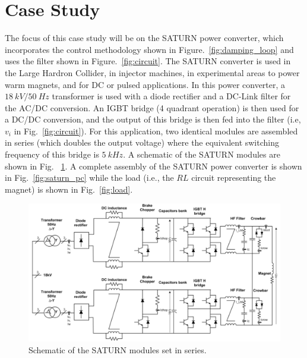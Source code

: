\documentclass[a4paper, 10pt, conference]{ieeeconf}
\begin{document}
\section{Case Study}
\label{sec:case}
The focus of this case study will be on the SATURN power converter, which incorporates the control methodology shown in Figure.~\ref{fig:damping_loop} and uses the filter shown in Figure.~\ref{fig:circuit}. The SATURN converter is used in the Large Hardron Collider, in injector machines, in experimental areas to power warm magnets, and for DC or pulsed applications. In this power converter, a $18\:kV/50\:Hz$ transformer is used with a diode rectifier and a DC-Link filter for the AC/DC conversion. An IGBT bridge (4 quadrant operation) is then used for a DC/DC conversion, and the output of this bridge is then fed into the filter (i.e, $v_i$ in Fig.~\ref{fig:circuit}). For this application, two identical modules are assembled in series (which doubles the output voltage) where the equivalent switching frequency of this bridge is $5 \: kHz$. A schematic of the SATURN modules are shown in Fig.~ \ref{fig:schematic}. A complete assembly of the SATURN power converter is shown in Fig.~\ref{fig:saturn_pc} while the load (i.e., the $RL$ circuit representing the magnet) is shown in Fig.~\ref{fig:load}.

\begin{figure}
\centering
\includegraphics[width=\columnwidth]{../pics/schematic}
\caption{Schematic of the SATURN modules set in series.}
\label{fig:schematic}
\end{figure} 
\end{document}
